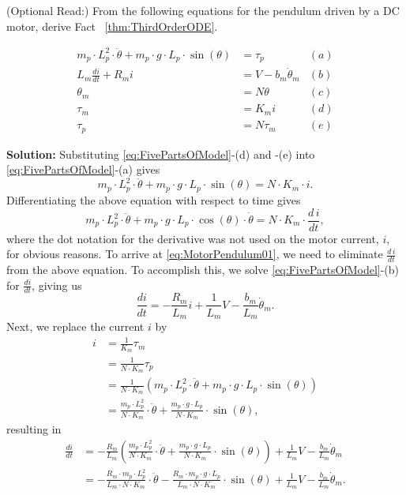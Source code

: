 \begin{example}(Optional Read:) From the following equations for the pendulum driven by a DC motor, derive Fact ~\ref{thm:ThirdOrderODE}.

\begin{equation}
\label{eq:FivePartsOfModel}
  \begin{aligned}
 m_p \cdot L_p^2 \cdot \ddot{\theta} + m_p \cdot g\cdot L_p \cdot \sin(\theta) &= \tau_p & (a)\\
 L_m \frac{d i}{dt} + R_m i &= V - b_m \dot{\theta}_m  & (b)\\
 \theta_m &= N \theta  & (c)\\
\tau_m &= K_m  i & (d)\\
\tau_p &= N \tau_m & (e)
\end{aligned}  
\end{equation}    
\end{example}
\textbf{Solution:} Substituting \eqref{eq:FivePartsOfModel}-(d) and -(e) into \eqref{eq:FivePartsOfModel}-(a) gives
$$ m_p \cdot L_p^2 \cdot \ddot{\theta} + m_p \cdot g\cdot L_p \cdot \sin(\theta) =  N \cdot  K_m \cdot i.  $$
Differentiating the above equation with respect to time gives
\begin{equation}
\label{eq:MotorPendulum02}
   m_p \cdot L_p^2 \cdot \dddot{\theta} + m_p \cdot g\cdot L_p \cdot \cos(\theta) \cdot \dot{\theta} =  N \cdot  K_m \cdot \frac{d\,i}{dt}, 
\end{equation}
where the dot notation for the derivative was not used on the motor current, $i$, for obvious reasons. To arrive at \eqref{eq:MotorPendulum01}, we need to eliminate $\frac{d\,i}{dt}$ from the above equation. To accomplish this, we solve \eqref{eq:FivePartsOfModel}-(b) for $\frac{d i}{dt}$, giving us
$$ \frac{d i}{dt} = - \frac{R_m}{L_m} i + \frac{1}{L_m }V - \frac{b_m}{L_m} \dot{\theta}_m. $$
Next, we replace the current $i$ by 
\begin{align*}
    i & = \frac{1}{K_m} \tau_m \\
    & =  \frac{1}{N \cdot K_m} \tau_p \\
    &  = \frac{1}{N \cdot K_m} \left(   m_p \cdot L_p^2 \cdot \ddot{\theta} + m_p \cdot g\cdot L_p \cdot \sin(\theta)  \right) \\
    & =   \frac{m_p \cdot L_p^2}{N \cdot K_m} \cdot \ddot{\theta} + \frac{m_p \cdot g\cdot L_p}{N \cdot K_m} \cdot \sin(\theta),
\end{align*}
resulting in 
\begin{equation}
\label{eq:MotorPendulum03}
\begin{aligned}
    \frac{d i}{dt} &= - \frac{R_m}{L_m} \left(  \frac{m_p \cdot L_p^2}{N \cdot K_m} \cdot \ddot{\theta} + \frac{m_p \cdot g\cdot L_p}{N \cdot K_m} \cdot \sin(\theta) \right) + \frac{1}{L_m }V - \frac{b_m}{L_m} \dot{\theta}_m \\[1em]
    & = -\frac{R_m \cdot m_p \cdot L_p^2}{L_m \cdot N \cdot K_m} \cdot \ddot{\theta} - \frac{R_m \cdot m_p \cdot g\cdot L_p}{L_m \cdot N \cdot K_m} \cdot \sin(\theta) + \frac{1}{L_m }V - \frac{b_m}{L_m} \dot{\theta}_m.
\end{aligned}     
\end{equation}
